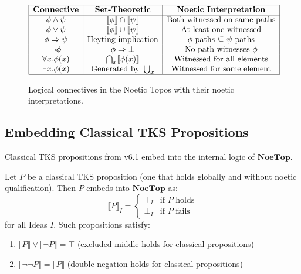 \begin{figure}[ht]
\centering
\[
\begin{array}{|c|c|c|}
\hline
\textbf{Connective} & \textbf{Set-Theoretic} & \textbf{Noetic Interpretation} \\
\hline
\phi \land \psi & \llbracket\phi\rrbracket \cap \llbracket\psi\rrbracket & \text{Both witnessed on same paths} \\
\phi \lor \psi & \llbracket\phi\rrbracket \cup \llbracket\psi\rrbracket & \text{At least one witnessed} \\
\phi \Rightarrow \psi & \text{Heyting implication} & \text{$\phi$-paths $\subseteq$ $\psi$-paths} \\
\neg \phi & \phi \Rightarrow \bot & \text{No path witnesses $\phi$} \\
\forall x.\phi(x) & \bigcap_x \llbracket\phi(x)\rrbracket & \text{Witnessed for all elements} \\
\exists x.\phi(x) & \text{Generated by } \bigcup_x & \text{Witnessed for some element} \\
\hline
\end{array}
\]
\caption{Logical connectives in the Noetic Topos with their noetic interpretations.}
\label{fig:logical-connectives}
\end{figure}

\subsection{Embedding Classical TKS Propositions}
\label{subsec:classical-embedding}

Classical TKS propositions from v6.1 embed into the internal logic of $\mathbf{NoeTop}$.

\begin{proposition}
\label{prop:classical-embedding}
Let $P$ be a classical TKS proposition (one that holds globally and without
noetic qualification). Then $P$ embeds into $\mathbf{NoeTop}$ as:
\[
  \llbracket P \rrbracket_I = \begin{cases}
    \top_I & \text{if } P \text{ holds} \\
    \bot_I & \text{if } P \text{ fails}
  \end{cases}
\]
for all Ideas $I$. Such propositions satisfy:
\begin{enumerate}[label=(\roman*)]
  \item $\llbracket P \rrbracket \lor \llbracket \neg P \rrbracket = \top$
        (excluded middle holds for classical propositions)
  \item $\llbracket \neg\neg P \rrbracket = \llbracket P \rrbracket$
        (double negation holds for classical propositions)
\end{enumerate}
\end{proposition}

